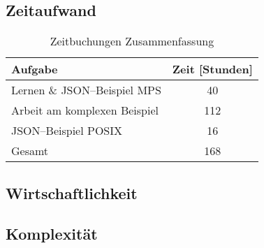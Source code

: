 \lipsum[5]

\subsection{Zeitaufwand}\label{subsec:zeitaufwand}
\begin{table}[ht]
    \centering
    \begin{tabular}{|l|c|}
        \hline
        Aufgabe                                & Zeit [Stunden] \\
        \hline
        \hline
        Lernen \& \ac{JSON}--Beispiel \ac{MPS}   & 40             \\
        \hline
        Arbeit am komplexen Beispiel           & 112            \\
        \hline
        \ac{JSON}--Beispiel \ac{POSIX}          & 16             \\
        \hline
        \hline
        Gesamt                                 & 168            \\
        \hline
    \end{tabular}
    \caption{Zeitbuchungen Zusammenfassung}
    \label{tab:zeitbuchungen-short}
\end{table}
\lipsum[5]

\subsection{Wirtschaftlichkeit}\label{subsec:wirtschaftlichkeit}
\lipsum[5]

\subsection{Komplexität}\label{subsec:komplexitat}
\lipsum[5]
